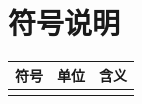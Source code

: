 \section{符号说明}

\begin{table}[htbp]
  \centering
  \begin{tabularx}{\linewidth}{llX}
    \toprule
    符号 & 单位 & 含义 \\
    \midrule
     &  &  \\
    \bottomrule
  \end{tabularx}
\end{table}
